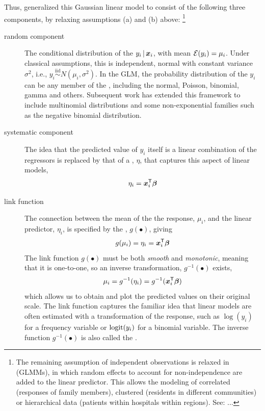 \documentclass[11pt]{book}\usepackage[]{graphicx}\usepackage[]{color}
\begin{document}
Thus, \citet{NelderWedderburn:72} generalized this Gaussian linear model to
consist of the following three components, by relaxing assumptions (a) and (b) above:%
\footnote{The remaining assumption of independent observations is relaxed in
 (GLMMs), in which random effects to account for non-independence
are added to the linear predictor.
This allows the modeling of correlated (responses of family members), clustered (residents in 
different communities)
or hierarchical data
(patients within hospitals within regions). See: \citet{McCullochNeuhaus:2005} ...
}

\begin{description}
  \item[random component] The conditional distribution of the $y_i \, | \, \bm{x}_i$,
  with mean $\mathcal{E} (y_i) = \mu_i$. Under classical assumptions,
  this is independent, normal with constant variance $\sigma^2$, i.e.,
  $ y_i \stackrel{\textrm{iid}}{\sim} N (\mu_i, \sigma^2)$.
  In the GLM, the probability distribution of the $y_i$ can be any member of the 
  , including the normal, Poisson, binomial, gamma
  and others. Subsequent work has extended this framework to include
  multinomial distributions and some non-exponential families such as the
  negative binomial distribution.
  
  
  \item[systematic component] The idea that the predicted value of $y_i$ itself
  is a linear
  combination of the regressors is replaced by that of a ,
  $\eta$, that captures this aspect of linear models,
\begin{equation*}
\eta_i = \bm{x}_i^\mathsf{T} \bm{\beta}
\end{equation*}
  
  
  \item[link function] The connection between the mean of the the response, $\mu_i$,
  and the linear predictor, $\eta_i$, is specified by the ,
  $g(\bullet)$, giving
\begin{equation*}
g(\mu_i) = \eta_i = \bm{x}_i^\mathsf{T} \bm{\beta}
\end{equation*}
  The link function $g(\bullet)$ must be both \emph{smooth} and \emph{monotonic}, meaning that
  it is one-to-one, so an inverse transformation, $g^{-1}(\bullet)$ exists, 
\begin{equation*}
\mu_i = g^{-1}(\eta_i) = g^{-1}(\bm{x}_i^\mathsf{T} \bm{\beta})
\end{equation*}
  which allows us to obtain and plot the predicted values on their original scale.  The link function
  captures the familiar idea that linear models are often estimated with a transformation
  of the response, such as $\log(y_i)$ for a frequency variable or $\logit(y_i)$
  for a binomial variable.  The inverse function $g^{-1}(\bullet)$ 
  is also called the . 
\end{description}
\end{document}
